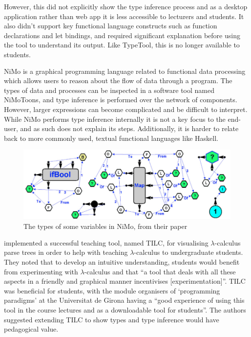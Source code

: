\documentclass[a4paper,fleqn,oneside,12pt]{report}
\begin{document}
However, this did not explicitly show the type inference process and as a desktop application rather than web app it is less accessible to lecturers and students. It also didn't support key functional language constructs such as function declarations and let bindings, and required significant explanation before using the tool to understand its output. Like TypeTool, this is no longer available to students.

NiMo \citep{ref8} is a graphical programming language related to functional data processing which allows users to reason about the flow of data through a program. The types of data and processes can be inspected in a software tool named NiMoToons, and type inference is performed over the network of components. However, larger expressions can become complicated and be difficult to interpret. While NiMo performs type inference internally it is not a key focus to the end-user, and as such does not explain its steps. Additionally, it is harder to relate back to more commonly used, textual functional languages like Haskell.

{\centering \begin{figure}[h!]
  \centering
  \includegraphics[width=\linewidth]{images/image25.png}
  \caption{The types of some variables in NiMo, from their paper}
\end{figure} \par}

\cite{ref9} implemented a successful teaching tool, named TILC, for visualising $\lambda$-calculus parse trees in order to help with teaching $\lambda$-calculus to undergraduate students. They noted that to develop an intuitive understanding, students would benefit from experimenting with $\lambda$-calculus and that “a tool that deals with all these aspects in a friendly and graphical manner incentivises [experimentation]”. TILC was beneficial for students, with the module organisers of `programming paradigms' at the Universitat de Girona having a ``good experience of using this tool in the course lectures and as a downloadable tool for students''. The authors suggested extending TILC to show types and type inference would have pedagogical value.
\end{document}
